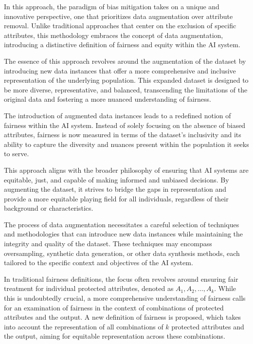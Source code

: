 \documentclass[12pt,a4paper,openright,twoside]{book}
\begin{document}
In this approach, the paradigm of bias mitigation takes on a unique and innovative perspective, one that prioritizes data augmentation over attribute removal. Unlike traditional approaches that center on the exclusion of specific attributes, this methodology embraces the concept of data augmentation, introducing a distinctive definition of fairness and equity within the AI system.

The essence of this approach revolves around the augmentation of the dataset by introducing new data instances that offer a more comprehensive and inclusive representation of the underlying population. This expanded dataset is designed to be more diverse, representative, and balanced, transcending the limitations of the original data and fostering a more nuanced understanding of fairness. 

The introduction of augmented data instances leads to a redefined notion of fairness within the AI system. Instead of solely focusing on the absence of biased attributes, fairness is now measured in terms of the dataset's inclusivity and its ability to capture the diversity and nuances present within the population it seeks to serve. 

This approach aligns with the broader philosophy of ensuring that AI systems are equitable, just, and capable of making informed and unbiased decisions. By augmenting the dataset, it strives to bridge the gaps in representation and provide a more equitable playing field for all individuals, regardless of their background or characteristics. 

The process of data augmentation necessitates a careful selection of techniques and methodologies that can introduce new data instances while maintaining the integrity and quality of the dataset. These techniques may encompass oversampling, synthetic data generation, or other data synthesis methods, each tailored to the specific context and objectives of the AI system.

In traditional fairness definitions, the focus often revolves around ensuring fair treatment for individual protected attributes, denoted as $A_1, A_2, \ldots, A_k$. While this is undoubtedly crucial, a more comprehensive understanding of fairness calls for an examination of fairness in the context of combinations of protected attributes and the output. A new definition of fairness is proposed, which takes into account the representation of all combinations of $k$ protected attributes and the output, aiming for equitable representation across these combinations.
\end{document}
